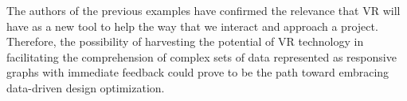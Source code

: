 The authors of the previous examples \cite{Wolfartsberger2019} \cite{Muhammad2020} have confirmed the relevance that VR will have as a new tool to help the way that we interact and approach a project. Therefore, the possibility of harvesting the potential of VR technology in facilitating the comprehension of complex sets of data represented as responsive graphs with immediate feedback could prove to be the path toward embracing data-driven design optimization.